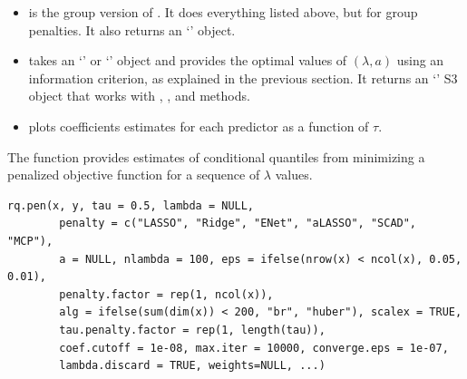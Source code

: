 \begin{itemize}
\item
   is the group version of . It does everything listed above, but for group penalties. It also returns an `' object.
\item
   takes an `' or `' object and provides the optimal values of \((\lambda,a)\) using an information criterion, as explained in the previous section. It returns an `' S3 object that works with , , and  methods.
\item
   plots coefficients estimates for each predictor as a function of \(\tau\).
\end{itemize}

The  function provides estimates of conditional quantiles from minimizing a penalized objective function for a sequence of \(\lambda\) values.

\begin{verbatim}
rq.pen(x, y, tau = 0.5, lambda = NULL,
        penalty = c("LASSO", "Ridge", "ENet", "aLASSO", "SCAD", "MCP"),
        a = NULL, nlambda = 100, eps = ifelse(nrow(x) < ncol(x), 0.05, 0.01),
        penalty.factor = rep(1, ncol(x)), 
        alg = ifelse(sum(dim(x)) < 200, "br", "huber"), scalex = TRUE,
        tau.penalty.factor = rep(1, length(tau)), 
        coef.cutoff = 1e-08, max.iter = 10000, converge.eps = 1e-07, 
        lambda.discard = TRUE, weights=NULL, ...)
\end{verbatim}

